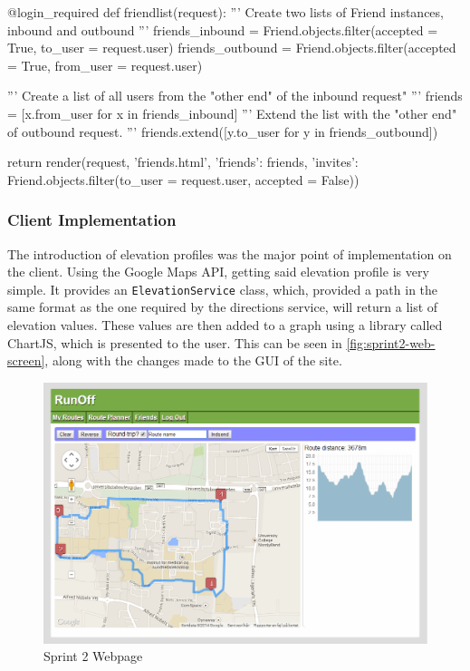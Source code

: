 \begin{code}[label={lst:sprint2-get-friends}, caption={'Friend List' function}, language={Python}]
@login_required
def friendlist(request):
	''' Create two lists of Friend instances, inbound and outbound '''
	friends_inbound = Friend.objects.filter(accepted = True, to_user = request.user)
	friends_outbound = Friend.objects.filter(accepted = True, from_user = request.user)
	
	''' Create a list of all users from the "other end" of the inbound request" '''
	friends = [x.from_user for x in friends_inbound]
	''' Extend the list with the "other end" of outbound request. '''
	friends.extend([y.to_user for y in friends_outbound])
	
	return render(request,
	              'friends.html',
	              {'friends': friends,
				   'invites': Friend.objects.filter(to_user = request.user, accepted = False)})
\end{code}

\subsubsection{Client Implementation}
The introduction of elevation profiles was the major point of implementation on the client. Using the Google Maps \ac{API}, getting said elevation profile is very simple. It provides an \texttt{ElevationService} class, which, provided a path in the same format as the one required by the directions service, will return a list of elevation values. These values are then added to a graph using a library called ChartJS\cite{chartjs}, which is presented to the user. This can be seen in \autoref{fig:sprint2-web-screen}, along with the changes made to the \ac{GUI} of the site.

\begin{figure}[!ht]
	\centering
	\includegraphics[width=\textwidth]{img/webplanner2.png}
	\caption{Sprint 2 Webpage}
	\label{fig:sprint2-web-screen}
\end{figure}

